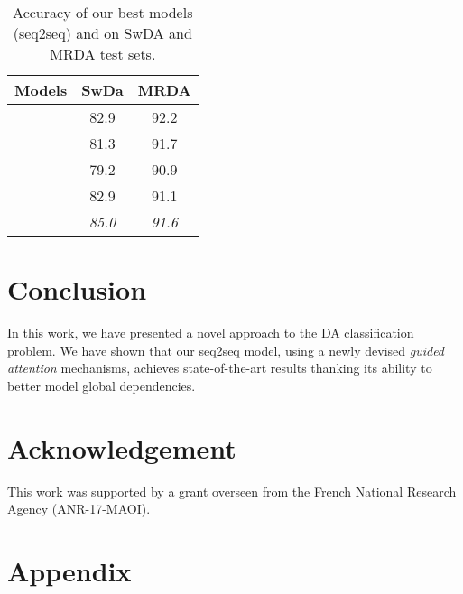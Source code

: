 \documentclass[letterpaper]{article} \usepackage{aaai20}  \usepackage{times}  \usepackage{helvet} \usepackage{courier}  \usepackage[hyphens]{url}  \usepackage{graphicx} \urlstyle{rm} \def\UrlFont{\rm}  \usepackage{graphicx}  \frenchspacing  \setlength{\pdfpagewidth}{8.5in}  \setlength{\pdfpageheight}{11in}
\newcommand{\citet}[1]{\citeauthor{#1} \shortcite{#1}}
\begin{document}
\begin{table}[!htb]
\centering
\begin{tabular}{c|c|c}
\hline
    Models & SwDa & MRDA\\ 
    \hline
   \citet{crf_multi_task}& 82.9 & 92.2 \\
\citet{LSTM_CRF} & 81.3 & 91.7  \\
  \citet{hierarchical_LSTM_CRF} &79.2& 90.9 \\ 
  \citet{DAClassifCxt} & 82.9 & 91.1 \\
       \hline
     & \textit{85.0}& \textit{91.6}\\
     \hline
\end{tabular}
\caption{Accuracy of our best models (seq2seq) and  on SwDA and MRDA test sets.}
\label{tab:state_of_the_art}
\end{table}


\section{Conclusion}
In this work, we have presented a novel approach to the DA classification problem. We have shown that our seq2seq model, using a newly devised \textit{guided attention} mechanisms, achieves state-of-the-art results thanking its ability to better model global dependencies.\\


\section*{Acknowledgement}
This work was supported by a grant overseen from the French National Research Agency (ANR-17-MAOI).























\appendix
\clearpage
\appendix\section{Appendix}
\label{sec:appendix}
\end{document}
